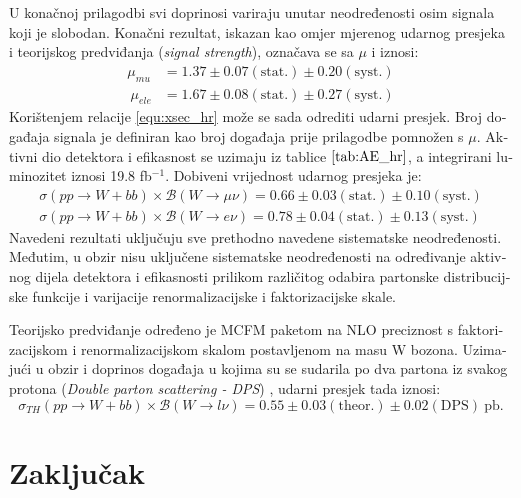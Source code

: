 \begin{otherlanguage}{croatian}
U konačnoj prilagodbi svi doprinosi variraju unutar neodređenosti osim signala koji je slobodan. Konačni rezultat, iskazan kao omjer mjerenog udarnog presjeka i teorijskog predviđanja (\textit{signal strength}), označava se sa $\mu$ i iznosi:
\begin{align*}
\mu_{mu} &= 1.37 \pm 0.07\mathrm{(stat.)} \pm 0.20 \mathrm{(syst.)}\\\
\mu_{ele} &= 1.67 \pm 0.08\mathrm{(stat.)} \pm 0.27\mathrm{(syst.)}
\end{align*}
Korištenjem relacije \ref{equ:xsec_hr} može se sada odrediti udarni presjek. Broj događaja signala je definiran kao broj događaja prije prilagodbe pomnožen s $\mu$. Aktivni dio detektora i efikasnost se uzimaju iz tablice $\ref{tab:AE_hr}$, a integrirani luminozitet iznosi 19.8 fb$^{-1}$. Dobiveni vrijednost udarnog presjeka je:
\begin{align*}
\sigma(pp\rightarrow W+bb)\times \mathcal{B}(W\rightarrow \mu\nu) = 0.66 \pm 0.03(\mathrm{stat.}) \pm 0.10(\mathrm{syst.})\\
\sigma(pp\rightarrow W+bb)\times \mathcal{B}(W\rightarrow e\nu) = 0.78 \pm 0.04(\mathrm{stat.}) \pm 0.13(\mathrm{syst.})
\end{align*} 
Navedeni rezultati uključuju sve prethodno navedene sistematske neodređenosti. Međutim, u obzir nisu uključene sistematske neodređenosti na određivanje aktivnog dijela detektora i efikasnosti prilikom različitog odabira partonske distribucijske funkcije i varijacije renormalizacijske i faktorizacijske skale.
\par Teorijsko predviđanje određeno je MCFM paketom na NLO preciznost s faktorizacijskom i renormalizacijskom skalom postavljenom na masu W bozona. Uzimajući u obzir i doprinos događaja u kojima su se sudarila po dva partona iz svakog protona (\textit{Double parton scattering - DPS}) \cite{Chatrchyan:2013xxa}, udarni presjek tada iznosi:
\begin{equation*}
\sigma_{TH}(pp\rightarrow W+bb)\times \mathcal{B}(W\rightarrow l\nu) = 0.55 \pm 0.03 \mathrm{(theor.)} \pm 0.02 \mathrm{(DPS)} \mathrm{\ pb}.
\end{equation*}

 

\section{Zaključak}


\end{otherlanguage}
